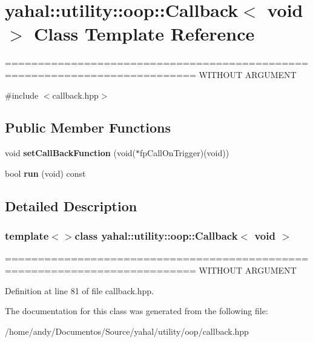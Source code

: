 \hypertarget{classyahal_1_1utility_1_1oop_1_1_callback_3_01void_01_4}{}\section{yahal\+:\+:utility\+:\+:oop\+:\+:Callback$<$ void $>$ Class Template Reference}
\label{classyahal_1_1utility_1_1oop_1_1_callback_3_01void_01_4}


=========================================================================== W\+I\+T\+H\+O\+U\+T A\+R\+G\+U\+M\+E\+N\+T  




{\ttfamily \#include $<$callback.\+hpp$>$}

\subsection*{Public Member Functions}
\begin{DoxyCompactItemize}
\item 
\hypertarget{classyahal_1_1utility_1_1oop_1_1_callback_3_01void_01_4_ad2f0d55b5a796e8537e359ae766acb54}{}void {\bfseries set\+Call\+Back\+Function} (void($\ast$fp\+Call\+On\+Trigger)(void))\label{classyahal_1_1utility_1_1oop_1_1_callback_3_01void_01_4_ad2f0d55b5a796e8537e359ae766acb54}

\item 
\hypertarget{classyahal_1_1utility_1_1oop_1_1_callback_3_01void_01_4_a0d1ef309320425a2606086152b1f97fa}{}bool {\bfseries run} (void) const \label{classyahal_1_1utility_1_1oop_1_1_callback_3_01void_01_4_a0d1ef309320425a2606086152b1f97fa}

\end{DoxyCompactItemize}


\subsection{Detailed Description}
\subsubsection*{template$<$$>$class yahal\+::utility\+::oop\+::\+Callback$<$ void $>$}

=========================================================================== W\+I\+T\+H\+O\+U\+T A\+R\+G\+U\+M\+E\+N\+T 

Definition at line 81 of file callback.\+hpp.



The documentation for this class was generated from the following file\+:\begin{DoxyCompactItemize}
\item 
/home/andy/\+Documentos/\+Source/yahal/utility/oop/callback.\+hpp\end{DoxyCompactItemize}
